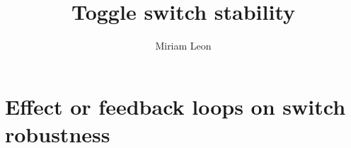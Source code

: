 \documentclass[]{../chapter_only}
\title{Toggle switch stability}
\author{Miriam Leon}
\begin{document}

\tableofcontents*
{}


\mainmatter*
\chapter{Effect or feedback loops on switch robustness}





\printbibliography
\end{document}
